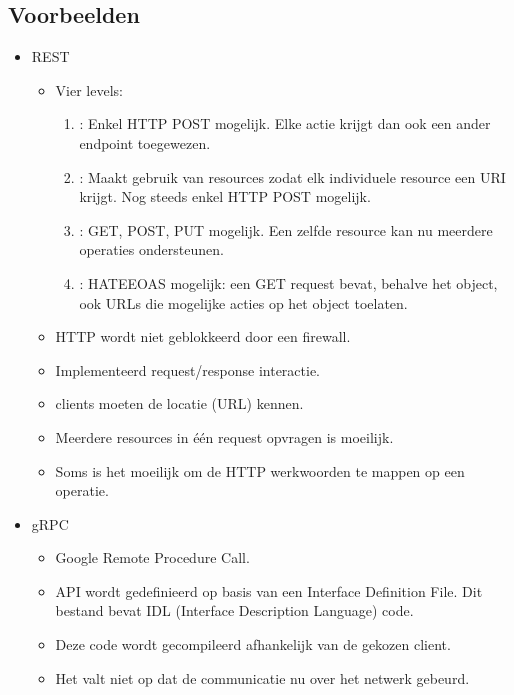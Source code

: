 	\subsection{Voorbeelden}
	\begin{itemize}
		\item[\info] REST
		\begin{itemize}
			\item[\info] Vier levels:
			\begin{enumerate}
				\item[0]: Enkel HTTP POST mogelijk. Elke actie krijgt dan ook een ander endpoint toegewezen.
				\item[1]: Maakt gebruik van resources zodat elk individuele resource een URI krijgt. Nog steeds enkel HTTP POST mogelijk.
				\item[2]: GET, POST, PUT mogelijk. Een zelfde resource kan nu meerdere operaties ondersteunen.
				\item[3]: HATEEOAS mogelijk: een GET request bevat, behalve het object, ook URLs die mogelijke acties op het object toelaten.
			\end{enumerate}
			\item[\good] HTTP wordt niet geblokkeerd door een firewall.
			\item[\good] Implementeerd request/response interactie.
			\item[\alert] clients moeten de locatie (URL) kennen.
			\item[\alert] Meerdere resources in één request opvragen is moeilijk. 
			\item[\alert] Soms is het moeilijk om de HTTP werkwoorden te mappen op een operatie.
		\end{itemize}
		\item[\info] gRPC
		\begin{itemize}
			\item[\info] Google Remote Procedure Call.
			\item[\info] API wordt gedefinieerd op basis van een Interface Definition File. Dit bestand bevat IDL (Interface Description Language) code.
			\item[\info] Deze code wordt gecompileerd afhankelijk van de gekozen client.
			\item[\alert] Het valt niet op dat de communicatie nu over het netwerk gebeurd.
		\end{itemize}
	\end{itemize}
